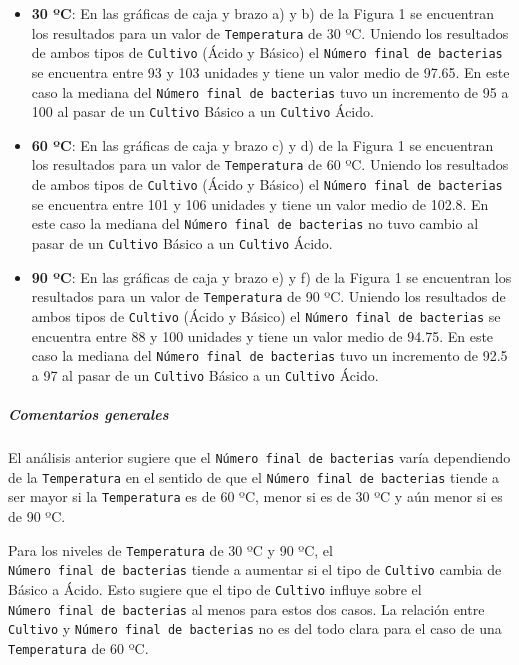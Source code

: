 \documentclass[10pt, spanish]{article}
\begin{document}
\begin{itemize}
\item
  \textbf{30 ºC}: En las gráficas de caja y brazo a) y b) de la Figura 1
  se encuentran los resultados para un valor de \texttt{Temperatura} de
  30 ºC. Uniendo los resultados de ambos tipos de \texttt{Cultivo}
  (Ácido y Básico) el \texttt{Número\ final\ de\ bacterias} se encuentra
  entre 93 y 103 unidades y tiene un valor medio de 97.65. En este caso
  la mediana del \texttt{Número\ final\ de\ bacterias} tuvo un
  incremento de 95 a 100 al pasar de un \texttt{Cultivo} Básico a un
  \texttt{Cultivo} Ácido.
\item
  \textbf{60 ºC}: En las gráficas de caja y brazo c) y d) de la Figura 1
  se encuentran los resultados para un valor de \texttt{Temperatura} de
  60 ºC. Uniendo los resultados de ambos tipos de \texttt{Cultivo}
  (Ácido y Básico) el \texttt{Número\ final\ de\ bacterias} se encuentra
  entre 101 y 106 unidades y tiene un valor medio de 102.8. En este caso
  la mediana del \texttt{Número\ final\ de\ bacterias} no tuvo cambio al
  pasar de un \texttt{Cultivo} Básico a un \texttt{Cultivo} Ácido.
\item
  \textbf{90 ºC}: En las gráficas de caja y brazo e) y f) de la Figura 1
  se encuentran los resultados para un valor de \texttt{Temperatura} de
  90 ºC. Uniendo los resultados de ambos tipos de \texttt{Cultivo}
  (Ácido y Básico) el \texttt{Número\ final\ de\ bacterias} se encuentra
  entre 88 y 100 unidades y tiene un valor medio de 94.75. En este caso
  la mediana del \texttt{Número\ final\ de\ bacterias} tuvo un
  incremento de 92.5 a 97 al pasar de un \texttt{Cultivo} Básico a un
  \texttt{Cultivo} Ácido.
\end{itemize}

\hypertarget{comentarios-generales}{%
\subparagraph{Comentarios generales}\label{comentarios-generales}}

El análisis anterior sugiere que el
\texttt{Número\ final\ de\ bacterias} varía dependiendo de la
\texttt{Temperatura} en el sentido de que el
\texttt{Número\ final\ de\ bacterias} tiende a ser mayor si la
\texttt{Temperatura} es de 60 ºC, menor si es de 30 ºC y aún menor si es
de 90 ºC.

Para los niveles de \texttt{Temperatura} de 30 ºC y 90 ºC, el
\texttt{Número\ final\ de\ bacterias} tiende a aumentar si el tipo de
\texttt{Cultivo} cambia de Básico a Ácido. Esto sugiere que el tipo de
\texttt{Cultivo} influye sobre el \texttt{Número\ final\ de\ bacterias}
al menos para estos dos casos. La relación entre \texttt{Cultivo} y
\texttt{Número\ final\ de\ bacterias} no es del todo clara para el caso
de una \texttt{Temperatura} de 60 ºC.
\end{document}
